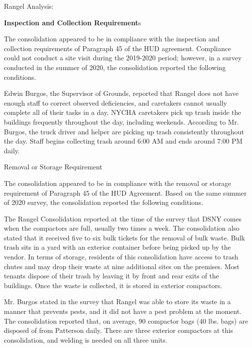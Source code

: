 Rangel Analysis: 



\textbf{Inspection and Collection Requirement}s 

 

The consolidation appeared to be in compliance with the inspection and collection requirements of Paragraph 45 of the HUD agreement. Compliance could not conduct a site visit during the 2019-2020 period; however, in a survey conducted in the summer of 2020, the consolidation reported the following conditions.



Edwin Burgos, the Supervisor of Grounds, reported that Rangel does not have enough staff to correct observed deficiencies, and caretakers cannot usually complete all of their tasks in a day. NYCHA caretakers pick up trash inside the buildings frequently throughout the day, including weekends. According to Mr. Burgos, the truck driver and helper are picking up trash consistently throughout the day.  Staff begins collecting trash around 6:00 AM and ends around 7:00 PM daily.

 

Removal or Storage Requirement 



The consolidation appeared to be in compliance with the removal or storage requirement of Paragraph  45 of the HUD Agreement. Based on the same summer of  2020 survey, the consolidation reported the following conditions.

 

The Rangel Consolidation reported at the time of the survey that DSNY comes when the compactors are full, usually two times a week. The consolidation also stated that it received five to six bulk tickets for the removal of bulk waste. Bulk trash sits in a yard with an exterior container before being picked up by the vendor. In terms of storage, residents of this consolidation have access to trash chutes and may drop their waste at nine additional sites on the premises.  Most tenants dispose of their trash by leaving it by front and rear exits of the buildings. Once the waste is collected, it is stored in exterior compactors.

 

Mr. Burgos stated in the survey that Rangel was able to store its waste in a manner that prevents pests, and it did not have a pest problem at the moment. The consolidation reported that, on average, 90 compactor bags (40 lbs. bags)  are disposed of from Patterson daily. There are three exterior compactors at this consolidation, and welding is needed on all three units. 



